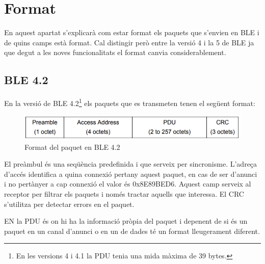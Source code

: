 \section{Format}
\label{sec:format}
En aquest apartat s'explicarà com estar format els paquets que s'envien en BLE i de quins camps està format.
Cal distingir però entre la versió 4 i la 5 de BLE ja que degut a les noves funcionalitats el format canvia considerablement.

\subsection{BLE 4.2}
En la versió de BLE 4.2\footnote{En les versions 4 i 4.1 la PDU tenia una mida màxima de 39 bytes.} els paquets que es transmeten tenen el següent format:

\begin{figure}[!h]
	\begin{center}
		\includegraphics[width=1\textwidth]{./images/Packet_format_4_2.png}
		\caption{Format del paquet en BLE 4.2 \cite{BLE_4.2_packet_format}}
	\end{center}
\end{figure}

El preàmbul és una seqüència predefinida i que serveix per sincronisme.
L'adreça d'accés identifica a quina connexió pertany aquest paquet, en cas de ser d'anunci i no pertànyer a cap connexió el valor és 0x8E89BED6.
Aquest camp serveix al receptor per filtrar els paquets i només tractar aquells que interessa.
El CRC s'utilitza per detectar errors en el paquet. 

EN la PDU és on hi ha la informació pròpia del paquet i depenent de si és un paquet en un canal d'anunci o en un de dades té un format lleugerament diferent.

\begin{figure}[!h]
	\begin{center}
		\begin{subfigmatrix}{1}
		\end{subfigmatrix}
	\end{center}
\end{figure}

